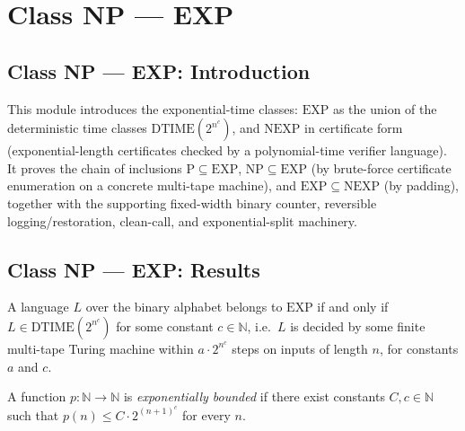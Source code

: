 \section{Class NP --- EXP}
\subsection*{Class NP --- EXP: Introduction}

This module introduces the exponential-time classes: $\mathrm{EXP}$ as the union of
the deterministic time classes $\mathrm{DTIME}(2^{n^c})$, and $\mathrm{NEXP}$ in
certificate form (exponential-length certificates checked by a polynomial-time
verifier language). It proves the chain of inclusions
$\mathrm{P} \subseteq \mathrm{EXP}$, $\mathrm{NP} \subseteq \mathrm{EXP}$ (by
brute-force certificate enumeration on a concrete multi-tape machine), and
$\mathrm{EXP} \subseteq \mathrm{NEXP}$ (by padding), together with the supporting
fixed-width binary counter, reversible logging/restoration, clean-call, and
exponential-split machinery.

\subsection*{Class NP --- EXP: Results}

\begin{definition}
\label{Complexity.EXP}
\leanok
{}
A language $L$ over the binary alphabet belongs to $\mathrm{EXP}$ if and only if
$L \in \mathrm{DTIME}(2^{n^c})$ for some constant $c \in \mathbb{N}$, i.e.\ $L$ is
decided by some finite multi-tape Turing machine within $a \cdot 2^{n^c}$ steps on
inputs of length $n$, for constants $a$ and $c$.
\end{definition}

\begin{definition}
\label{Complexity.ExpBound}
\leanok
A function $p : \mathbb{N} \to \mathbb{N}$ is \emph{exponentially bounded} if there
exist constants $C, c \in \mathbb{N}$ such that $p(n) \le C \cdot 2^{(n+1)^c}$ for
every $n$.
\end{definition}

